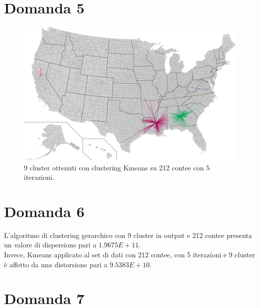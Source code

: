 \documentclass{article}
\begin{document}
\section*{Domanda 5}
\begin{center}
	\begin{figure}[H]
		\hspace*{1.5cm}\includegraphics[width=0.8\linewidth, valign=t]{figures/Domanda5}
		\caption*{9 cluster ottenuti con clustering Kmeans su 212 contee con 5 iterazioni.}
	\end{figure}
\end{center}
\section*{Domanda 6}
L'algoritmo di clustering gerarchico con 9 cluster in output e 212 contee presenta un valore di dispersione pari a $1.9675E+11$.\\
Invece, Kmeans applicato al set di dati con 212 contee, con 5 iterazioni e 9 cluster è affetto da una distorsione pari a $9.5383E+10$.

\section*{Domanda 7}
\end{document}

